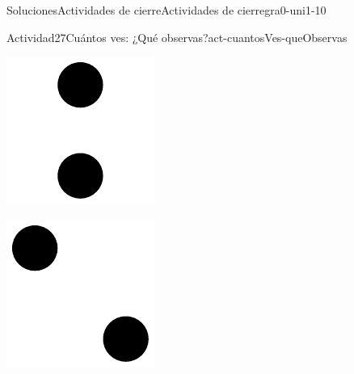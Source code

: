 \documentclass[twoside,10pt,]{article}
\begin{document}
\begin{solutions-section}{Soluciones}{Actividades de cierre}{}{Actividades de cierre}{}{}{gra0-uni1-10}
\begin{activitysolution}{Actividad}{27}{Cuántos ves: ¿Qué observas?}{act-cuantosVes-queObservas}
\begin{sidebyside}{2}{0}{0}{0}
\begin{sbspanel}{0.5}
\includegraphics[width=\linewidth]{external/svg-source/tikz-file-148154.pdf}
\end{sbspanel}%
\begin{sbspanel}{0.5}%
\includegraphics[width=\linewidth]{external/svg-source/tikz-file-147348.pdf}

\end{sbspanel}
\end{sidebyside}
\end{activitysolution}
\end{solutions-section}
\end{document}
